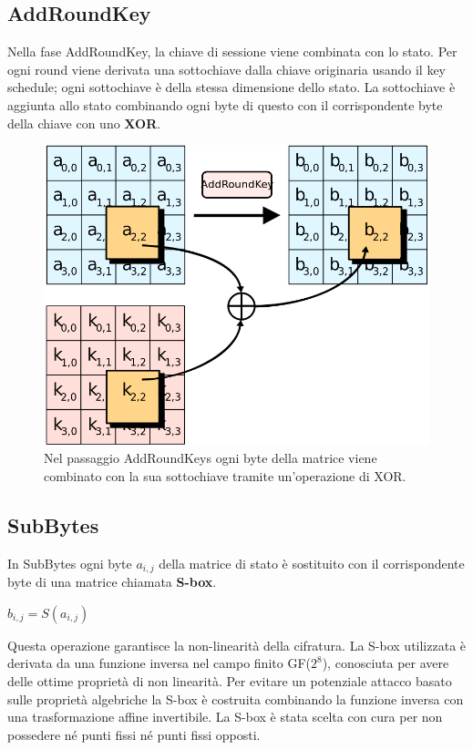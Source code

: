 \subsection{AddRoundKey}
Nella fase AddRoundKey, la chiave di sessione viene combinata con lo stato. Per ogni round viene derivata una sottochiave dalla chiave originaria usando il key schedule; ogni sottochiave è della stessa dimensione dello stato. La sottochiave è aggiunta allo stato combinando ogni byte di questo con il corrispondente byte della chiave con uno \textbf{XOR}. 

\begin{figure}[H]
\centering
\includegraphics[scale=0.3]{img/addroundkey}
\caption{Nel passaggio AddRoundKeys ogni byte della matrice viene combinato con la sua sottochiave tramite un'operazione di XOR.}
\end{figure}

\subsection{SubBytes}
In SubBytes ogni byte \(a_{i,j}\) della matrice di stato è sostituito con il corrispondente byte di una matrice chiamata  \textbf{S-box}.
\begin{center}
\(b_{i,j} = S(a_{i,j})\)
\end{center}

Questa operazione garantisce la non-linearità della cifratura. 
La S-box utilizzata è derivata da una funzione inversa nel campo finito GF(\(2^8\)), conosciuta per avere delle ottime proprietà di non linearità. Per evitare un potenziale attacco basato sulle proprietà algebriche la S-box è costruita combinando la funzione inversa con una trasformazione affine invertibile. La S-box è stata scelta con cura per non possedere né punti fissi né punti fissi opposti.

